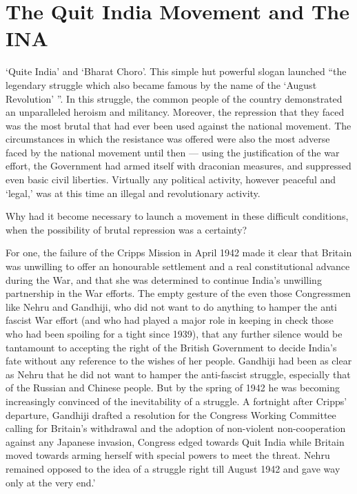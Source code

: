 \chapter[The Quit India Movement, INA \& Bharat Choro]{The Quit India Movement and The INA}

`Quite India' and `Bharat Choro'. This simple hut powerful slogan launched ``the legendary struggle which also became famous by the name of the `August Revolution' ''. In this struggle, the common people of the country demonstrated an unparalleled heroism and militancy. Moreover, the repression that they faced was the most brutal that had ever been used against the national movement. The circumstances in which the resistance was offered were also the most adverse faced by the national movement until then --- using the justification of the war effort, the Government had armed itself with draconian measures, and suppressed even basic civil liberties. Virtually any political activity, however peaceful and `legal,' was at this time an illegal and revolutionary activity.

Why had it become necessary to launch a movement in these difficult conditions, when the possibility of brutal repression was a certainty?

For one, the failure of the Cripps Mission in April 1942 made it clear that Britain was unwilling to offer an honourable settlement and a real constitutional advance during the War, and that she was determined to continue India's unwilling partnership in the War efforts. The empty gesture of the even those Congressmen like Nehru and Gandhiji, who did not want to do anything to hamper the anti fascist War effort (and who had played a major role in keeping in check those who had been spoiling for a tight since 1939), that any further silence would be tantamount to accepting the right of the British Government to decide India's fate without any reference to the wishes of her people. Gandhiji had been as clear as Nehru that he did not want to hamper the anti-fascist struggle, especially that of the Russian and Chinese people. But by the spring of 1942 he was becoming increasingly convinced of the inevitability of a struggle. A fortnight after Cripps' departure, Gandhiji drafted a resolution for the Congress Working Committee calling for Britain's withdrawal and the adoption of non-violent non-cooperation against any Japanese invasion, Congress edged towards Quit India while Britain moved towards arming herself with special powers to meet the threat. Nehru remained opposed to the idea of a struggle right till August 1942 and gave way only at the very end.'

